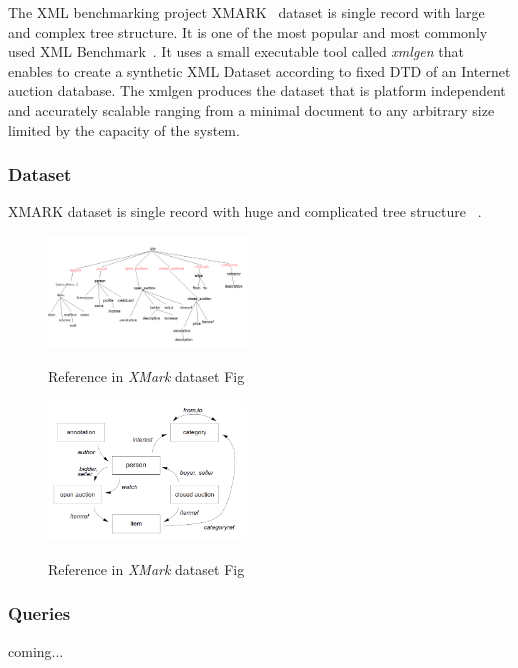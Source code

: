 The XML benchmarking project XMARK~\cite{xmark/original} dataset is single record with large and complex tree structure. It is one of the most popular and most commonly used XML Benchmark~\cite{xmark/mlynkova2008xml}. It uses a small executable tool called  \textit{xmlgen} that enables to create a synthetic XML Dataset according to fixed DTD of an Internet auction database. The xmlgen produces the dataset that is platform independent and accurately scalable ranging from a minimal document to any arbitrary size limited by the capacity of the system. 

\subsubsection{Dataset}
\label{xmark-dataset}
	XMARK dataset is single record with huge and complicated tree structure ~\cite{xml/VIST}. 
\begin{figure}
	\centering
	\includegraphics[width=0.47\textwidth]{img/xmark-tree.png}{
		\label{fig:xmark-tree}
	}
	\caption{Reference in \textit{XMark} dataset Fig~\cite{xmark/original}}
\end{figure}


\begin{figure}
	\centering
	\includegraphics[width=0.47\textwidth]{img/xmark-references.png}{
		\label{xmark-reference}
	}
	\caption{Reference in \textit{XMark} dataset Fig~\cite{xmark/original}}
	\label{figParseProcess}
\end{figure}

\subsubsection{Queries}
\label{xmark-queries}
coming...